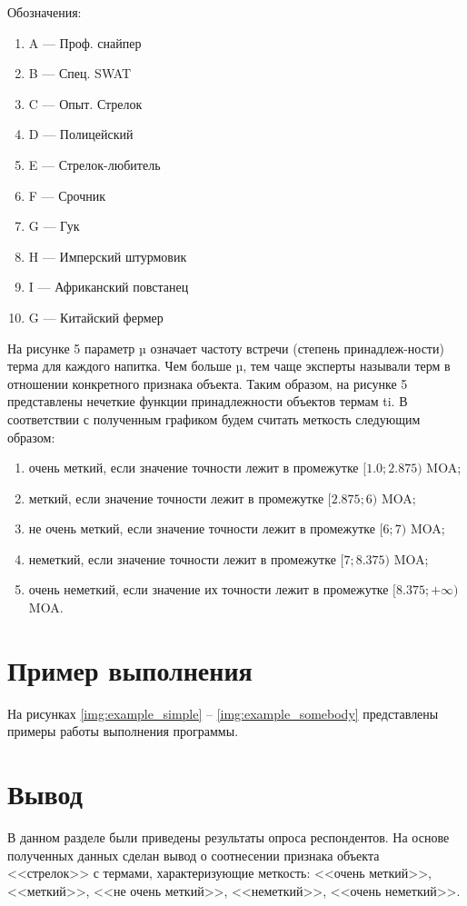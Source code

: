 Обозначения:
\begin{enumerate}[ 1{)}] 
    \item A --- Проф. снайпер
    \item B --- Спец. SWAT 
    \item C --- Опыт. Стрелок 
    \item D --- Полицейский 
    \item E --- Стрелок-любитель 
    \item F --- Срочник
    \item G --- Гук
    \item H --- Имперский штурмовик 
    \item I --- Африканский повстанец  
    \item G --- Китайский фермер
\end{enumerate}

На рисунке 5 параметр µ означает частоту встречи (степень принадлеж-ности) терма для каждого напитка. Чем больше µ, тем чаще эксперты называли
терм в отношении конкретного признака объекта. Таким образом, на рисунке 5
представлены нечеткие функции принадлежности объектов термам ti.
В соответствии с полученным графиком будем считать меткость следующим образом:
\begin{enumerate}[ 1{)}]
	\item очень меткий, если значение точности лежит в промежутке $[1.0; 2.875)$ MOA;
	\item меткий, если значение точности лежит в промежутке $[2.875; 6)$ MOA;
	\item не очень меткий, если значение точности лежит в промежутке $[6; 7)$ MOA;
	\item неметкий, если значение точности лежит в промежутке $[7; 8.375)$ MOA;
	\item очень неметкий, если значение их точности лежит в промежутке $[8.375; +\infty)$ MOA.
\end{enumerate}

\section{Пример выполнения}

На рисунках \ref{img:example_simple} -- \ref{img:example_somebody} представлены примеры работы выполнения программы.
{}%
{} %
\clearpage

\section*{Вывод}
В данном разделе были приведены результаты опроса респондентов. 
На основе полученных данных сделан вывод о соотнесении признака объекта <<стрелок>> с термами, характеризующие меткость: <<очень меткий>>, <<меткий>>, <<не очень меткий>>, <<неметкий>>, <<очень неметкий>>.
